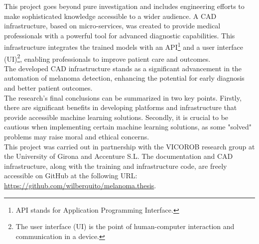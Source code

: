 This project goes beyond pure investigation and includes engineering efforts to
make sophisticated knowledge accessible to a wider audience. A CAD
infrastructure, based on micro-services, was created to provide medical
professionals with a powerful tool for advanced diagnostic capabilities. This
infrastructure integrates the trained models with an API\footnote{API stands
for Application Programming Interface.} and a user interface (UI)\footnote{The
  user interface (UI) is the point of human-computer interaction and
communication in a device.}, enabling professionals to improve patient care
and outcomes. \\

The developed CAD infrastructure stands as a significant advancement in the
automation of melanoma detection, enhancing the potential for early diagnosis
and better patient outcomes. \\

The research's final conclusions can be summarized in two key points. Firstly,
there are significant benefits in developing platforms and infrastructure that
provide accessible machine learning solutions. Secondly, it is crucial to be
cautious when implementing certain machine learning solutions, as some "solved"
problems may raise moral and ethical concerns. \\

This project was carried out in partnership with the VICOROB
research group at the University of Girona and Accenture S.L. The documentation
and CAD infrastructure, along with the training and infrastructure code, are
freely accessible on GitHub at the following URL:
\url{https://github.com/wilberquito/melanoma.thesis}.
